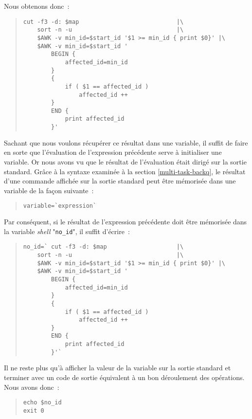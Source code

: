 Nous obtenons donc~:
\begin{quote}
\begin{verbatim}
cut -f3 -d: $map                            |\
    sort -n -u                              |\
    $AWK -v min_id=$start_id '$1 >= min_id { print $0}' |\
    $AWK -v min_id=$start_id '
        BEGIN {
            affected_id=min_id
        }
        {
            if ( $1 == affected_id )
                affected_id ++
        }
        END {
            print affected_id
        }'
\end{verbatim}
\end{quote}

Sachant que nous voulons r{\'e}cup{\'e}rer ce r{\'e}sultat dans une variable, il suffit
de faire en sorte que l'{\'e}valuation de l'expression pr{\'e}c{\'e}dente serve {\`a} initialiser
une variable. Or nous avons vu que le r{\'e}sultat de l'{\'e}valuation {\'e}tait dirig{\'e} sur
la sortie standard. Gr{\^a}ce {\`a} la syntaxe examin{\'e}e {\`a} la section \ref{multi-task-backq},
le r{\'e}sultat d'une commande affich{\'e}e sur la sortie standard peut {\^e}tre m{\'e}moris{\'e}e
dans une variable de la fa\c{c}on suivante~:
\begin{quote}
\begin{center}
\verb,variable=`expression`,
\end{center}
\end{quote}
Par cons{\'e}quent, si le r{\'e}sultat de l'expression pr{\'e}c{\'e}dente doit {\^e}tre m{\'e}moris{\'e}e dans
la variable {\sl shell} "{\tt no\_id}", il suffit d'{\'e}crire~:
\begin{quote}
\begin{verbatim}
no_id=` cut -f3 -d: $map                    |\
    sort -n -u                              |\
    $AWK -v min_id=$start_id '$1 >= min_id { print $0}' |\
    $AWK -v min_id=$start_id '
        BEGIN {
            affected_id=min_id
        }
        {
            if ( $1 == affected_id )
                affected_id ++
        }
        END {
            print affected_id
        }'`
\end{verbatim}
\end{quote}


Il ne reste plus qu'{\`a} afficher la valeur de la variable sur la
sortie standard et terminer avec un code de sortie {\'e}quivalent {\`a}
un bon d{\'e}roulement des op{\'e}rations. Nous avons donc~:
\begin{quote}
\begin{verbatim}
echo $no_id
exit 0
\end{verbatim}
\end{quote}

